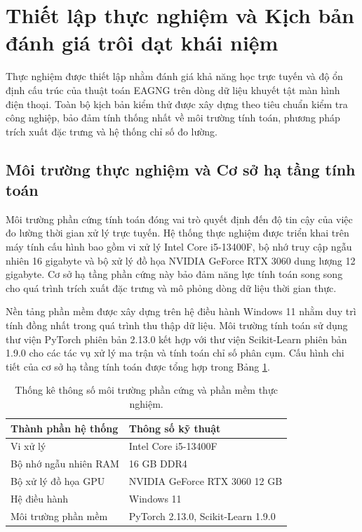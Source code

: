 \section{Thiết lập thực nghiệm và Kịch bản đánh giá trôi dạt khái niệm}

Thực nghiệm được thiết lập nhằm đánh giá khả năng học trực tuyến và độ ổn định cấu trúc của thuật toán EAGNG trên dòng dữ liệu khuyết tật màn hình điện thoại. Toàn bộ kịch bản kiểm thử được xây dựng theo tiêu chuẩn kiểm tra công nghiệp, bảo đảm tính thống nhất về môi trường tính toán, phương pháp trích xuất đặc trưng và hệ thống chỉ số đo lường.

\subsection{Môi trường thực nghiệm và Cơ sở hạ tầng tính toán}
\label{subsec:moi_truong_thuc_nghiem}

Môi trường phần cứng tính toán đóng vai trò quyết định đến độ tin cậy của việc đo lường thời gian xử lý trực tuyến. Hệ thống thực nghiệm được triển khai trên máy tính cấu hình bao gồm vi xử lý Intel Core i5-13400F, bộ nhớ truy cập ngẫu nhiên 16 gigabyte và bộ xử lý đồ họa NVIDIA GeForce RTX 3060 dung lượng 12 gigabyte. Cơ sở hạ tầng phần cứng này bảo đảm năng lực tính toán song song cho quá trình trích xuất đặc trưng và mô phỏng dòng dữ liệu thời gian thực.

Nền tảng phần mềm được xây dựng trên hệ điều hành Windows 11 nhằm duy trì tính đồng nhất trong quá trình thu thập dữ liệu. Môi trường tính toán sử dụng thư viện PyTorch phiên bản 2.13.0 kết hợp với thư viện Scikit-Learn phiên bản 1.9.0 cho các tác vụ xử lý ma trận và tính toán chỉ số phân cụm. Cấu hình chi tiết của cơ sở hạ tầng tính toán được tổng hợp trong Bảng \ref{tab:hardware_software_config}.

\begin{table}[htbp]
\centering
\caption{Thống kê thông số môi trường phần cứng và phần mềm thực nghiệm.}
\label{tab:hardware_software_config}
\begin{tabular}{|l|l|}
\hline
Thành phần hệ thống & Thông số kỹ thuật \\ \hline
Vi xử lý & Intel Core i5-13400F \\ \hline
Bộ nhớ ngẫu nhiên RAM & 16 GB DDR4 \\ \hline
Bộ xử lý đồ họa GPU & NVIDIA GeForce RTX 3060 12 GB \\ \hline
Hệ điều hành & Windows 11 \\ \hline
Môi trường phần mềm & PyTorch 2.13.0, Scikit-Learn 1.9.0 \\ \hline
\end{tabular}
\end{table}

